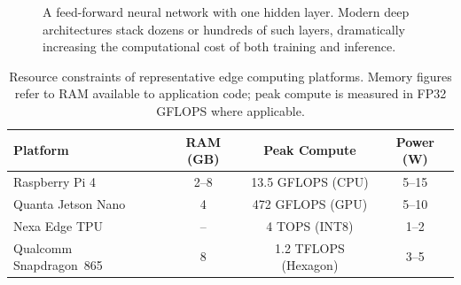 \documentclass[12pt,a4paper,oneside]{book}
\begin{document}
\begin{figure}[htbp]
\centering
{}
\caption{A feed-forward neural network with one hidden layer. Modern
deep architectures stack dozens or hundreds of such layers, dramatically
increasing the computational cost of both training and inference.}
\label{fig:nn}
\end{figure}

\begin{table}[htbp]
\centering
\caption{Resource constraints of representative edge computing platforms.
Memory figures refer to RAM available to application code; peak compute
is measured in FP32 GFLOPS where applicable.}
\label{tab:devices}
\begin{tabular}{@{}lccc@{}}
\toprule
\textbf{Platform} & \textbf{RAM (GB)} & \textbf{Peak Compute} & \textbf{Power (W)} \\
\midrule
Raspberry Pi 4        & 2--8  & 13.5 GFLOPS (CPU)      & 5--15  \\
Quanta Jetson Nano    & 4     & 472 GFLOPS (GPU)       & 5--10  \\
Nexa Edge TPU       & --    & 4 TOPS (INT8)          & 1--2   \\
Qualcomm Snapdragon~865 & 8  & 1.2 TFLOPS (Hexagon)   & 3--5   \\
\bottomrule
\end{tabular}
\end{table}

\newpage
\end{document}
